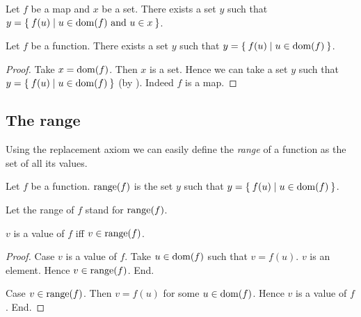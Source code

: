 \documentclass[../../set-theory.ftl.tex]{subfiles}
\begin{document}
  \begin{forthel}
    \begin{axiom}[Replacement]\label{SetTheory_02_01_303432}
      Let $f$ be a map and $x$ be a set.
      There exists a set $y$ such that $y = \Set{f(u) | \text{$u \in \operatorname{dom}(f)$ and $u \in x$}}$.
    \end{axiom}

    \begin{corollary}\label{SetTheory_02_01_297906}
      Let $f$ be a function.
      There exists a set $y$ such that $y = \Set{f(u) | u \in \operatorname{dom}(f)}$.
    \end{corollary}
    \begin{proof}
      Take $x = \operatorname{dom}(f)$.
      Then $x$ is a set.
      Hence we can take a set $y$ such that $y = \Set{f(u) | u \in \operatorname{dom}(f)}$ (by ).
      Indeed $f$ is a map.
    \end{proof}
  \end{forthel}


  \subsection{The range}

  Using the replacement axiom we can easily define the \textit{range} of a
  function as the set of all its values.

  \begin{forthel}
    \begin{definition}
      Let $f$ be a function.
      $\operatorname{range}(f)$ is the set $y$ such that $y = \Set{f(u) | u \in \operatorname{dom}(f)}$.
    \end{definition}

    Let the range of $f$ stand for $\operatorname{range}(f)$.


    \begin{proposition}\label{SetTheory_02_01_324423}
      $v$ is a value of $f$ iff $v \in \operatorname{range}(f)$.
    \end{proposition}
    \begin{proof}
      Case $v$ is a value of $f$.
        Take $u \in \operatorname{dom}(f)$ such that $v = f(u)$.
        $v$ is an element.
        Hence $v \in \operatorname{range}(f)$.
      End.

      Case $v \in \operatorname{range}(f)$.
        Then $v = f(u)$ for some $u \in \operatorname{dom}(f)$.
        Hence $v$ is a value of $f$.
      End.
    \end{proof}
  \end{forthel}
\end{document}

